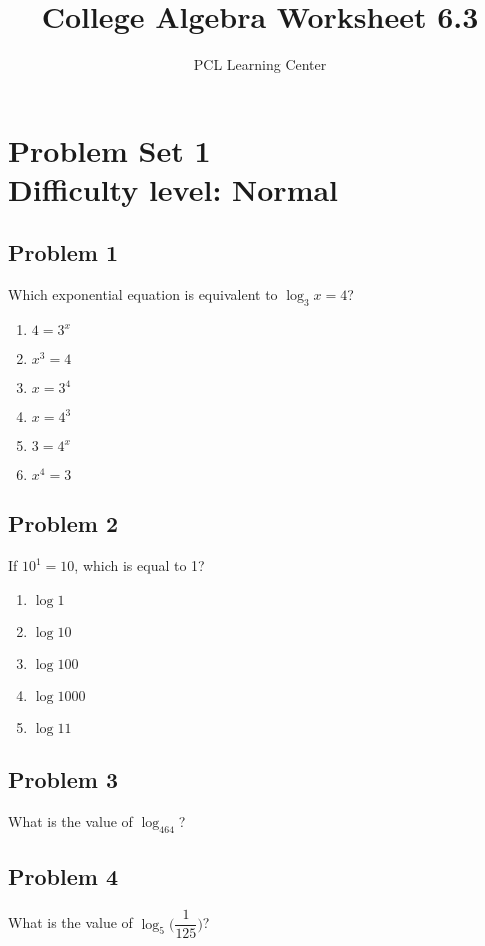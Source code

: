 \documentclass[12pt]{article}
\title{College Algebra Worksheet 6.3}
\author{PCL Learning Center}
\date{}
\begin{document}
\maketitle

\section*{Problem Set 1\\Difficulty level: Normal}

\subsection*{Problem 1}
Which exponential equation is equivalent to \( \log_3x=4\)?

\begin{enumerate}[label=(\alph*)]
    \item \( 4 = 3^x \)
    \item \( x^3=4 \)
    \item \( x = 3^4 \)
    \item \( x = 4^3 \)
    \item \( 3 = 4^x \)
    \item \( x^4=3 \)
\end{enumerate}

\subsection*{Problem 2}
If \( 10^1=10 \), which is equal to 1?

\begin{enumerate}[label=(\alph*)]
    \item \( \log 1 \)
    \item \( \log 10 \)
    \item \( \log 100 \)
    \item \( \log 1000 \)
    \item \( \log 11 \)
\end{enumerate}

\subsection*{Problem 3}
What is the value of \( \log_464 \)?

\subsection*{Problem 4}
What is the value of \(\log_5\Big(\dfrac{1}{125}\Big)\)?
\end{document}

